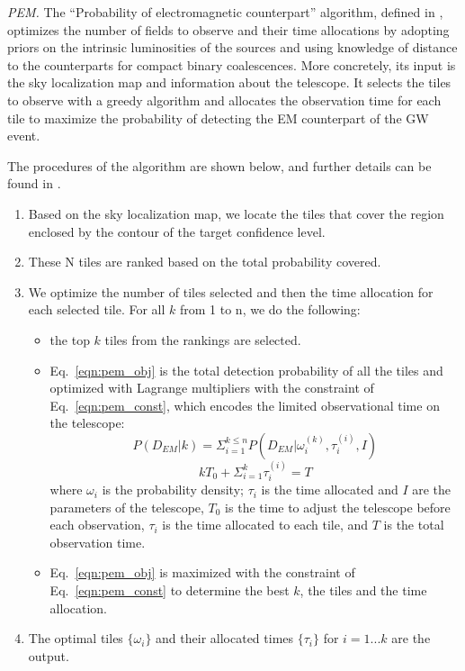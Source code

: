 \documentclass[twocolumn]{aastex62}
\begin{document}
\emph{PEM.} The ``Probability of electromagnetic counterpart'' algorithm, defined in \cite{ChHu2017}, optimizes the number of fields to observe and their time allocations by adopting priors on the intrinsic luminosities of the sources and using knowledge of distance to the counterparts for compact binary coalescences. More concretely, its input is the sky localization map and information about the telescope. It selects the tiles to observe with a greedy algorithm and allocates the observation time for each tile to maximize the probability of detecting the EM counterpart of the GW event. 

The procedures of the algorithm are shown below, and further details can be found in \cite{ChHu2017}.
\begin{enumerate}
\item Based on the sky localization map, we locate the tiles that cover the region enclosed by the contour of the target confidence level.
\item These N tiles are ranked based on the total probability covered.
\item We optimize the number of tiles selected and then the time allocation for each selected tile. For all $k$ from 1 to n, we do the following:
\begin{itemize}
\item the top $k$ tiles from the rankings are selected. 

\item Eq.~\ref{eqn:pem_obj} is the total detection probability of all the tiles and optimized with Lagrange multipliers with the constraint of Eq.~\ref{eqn:pem_const}, which encodes the limited observational time on the telescope: 
\begin{equation}\label{eqn:pem_obj}
P(D_{EM}|k)=\Sigma_{i=1}^{k\leq n}P(D_{EM}|\omega_i^{(k)}, \tau_i^{(i)},I)
\end{equation}
\begin{equation}\label{eqn:pem_const}
k T_0+\Sigma_{i=1}^k\tau_i^{(i)}=T
\end{equation}
where $\omega_i$ is the probability density; $\tau_i$ is the time allocated and $I$ are the parameters of the telescope, $T_0$ is the time to adjust the telescope before each observation, $\tau_i$ is the time allocated to each tile, and $T$ is the total observation time.
\item Eq.~\ref{eqn:pem_obj} is maximized with the constraint of Eq.~\ref{eqn:pem_const} to determine the best $k$, the tiles and the time allocation.
\end{itemize}

\item The optimal tiles $\{\omega_i\}$ and their allocated times $\{\tau_i\}$ for $i=1...k$ are the output.
\end{enumerate}
\end{document}
